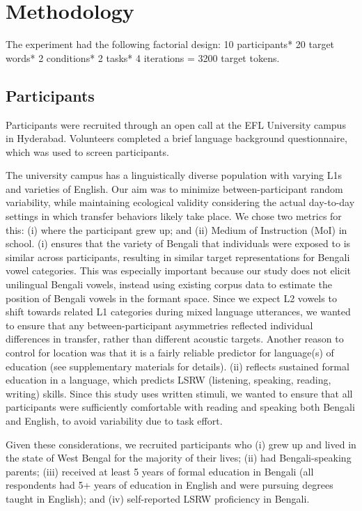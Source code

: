 \documentclass[12 pt]{article}
\begin{document}
\section{Methodology} \label{methodology}
The experiment had the following factorial design: 10 participants* 20 target words* 2 conditions* 2 tasks* 4 iterations = 3200 target tokens.

\subsection{Participants} \label{participants}
Participants were recruited through an open call at the EFL University campus in Hyderabad. Volunteers completed a brief language background questionnaire, which was used to screen participants. 

The university campus has a linguistically diverse population with varying L1s and varieties of English. Our aim was to minimize between-participant random variability, while maintaining ecological validity considering the actual day-to-day settings in which transfer behaviors likely take place. We chose two metrics for this: (i) where the participant grew up; and (ii) Medium of Instruction (MoI) in school. (i) ensures that the variety of Bengali that individuals were exposed to is similar across participants, resulting in similar target representations for Bengali vowel categories. This was especially important because our study does not elicit unilingual Bengali vowels, instead using existing corpus data to estimate the position of Bengali vowels in the formant space. Since we expect L2 vowels to shift towards related L1 categories during mixed language utterances, we wanted to ensure that any between-participant asymmetries reflected individual differences in transfer, rather than different acoustic targets. Another reason to control for location was that it is a fairly reliable predictor for language(s) of education (see supplementary materials for details). (ii) reflects sustained formal education in a language, which predicts LSRW (listening, speaking, reading, writing) skills. Since this study uses written stimuli, we wanted to ensure that all participants were sufficiently comfortable with reading and speaking both Bengali and English, to avoid variability due to task effort.  

Given these considerations, we recruited participants who (i) grew up and lived in the state of West Bengal for the majority of their lives; (ii) had Bengali-speaking parents; (iii) received at least 5 years of formal education in Bengali (all respondents had 5+ years of education in English and were pursuing degrees taught in English); and (iv) self-reported LSRW proficiency in Bengali. 
   
\end{document}
